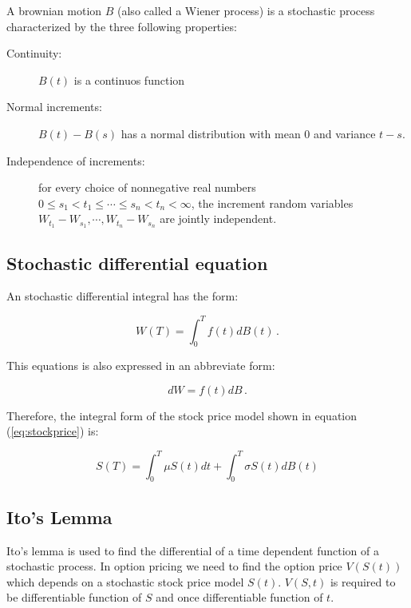 A brownian motion $B$ (also called a Wiener process) is a stochastic process characterized by the three following properties:

\begin{description}
\item[Continuity:] $B(t)$ is a continuos function
\item[Normal increments:]  $B(t)-B(s)$ has a normal distribution with mean $0$ and variance $t-s$.
\item[Independence of increments:] for every choice of nonnegative real numbers $0 \leq s_1 <  t_1 \leq \cdots \leq s_n < t_n < \infty$, the increment random variables $W_{t_1} - W_{s_1}, \cdots, W_{t_n} - W_{s_n}$ are jointly independent.
\end{description}

\subsection{Stochastic differential equation}

An stochastic differential integral has the form:


\begin{equation}
W(T)=\int_0^T f(t)dB(t) \, .
\end{equation}

\noindent This equations is also expressed in an abbreviate form:

\begin{equation}
dW = f(t) dB \, .
\end{equation}

\noindent Therefore, the integral form of the stock price model shown in equation (\ref{eq:stockprice}) is:

\begin{equation}
S(T)=\int_0^T \mu S(t) dt + \int_0^T \sigma S(t) dB(t)
\end{equation}

\subsection{Ito's Lemma}

Ito's lemma is used to find the differential of a time dependent function of a stochastic process. In option pricing we need to find the option price $V(S(t))$ which depends on a stochastic stock price model $S(t)$. 
$V(S,t)$ is required to be  differentiable function of $S$ and once differentiable function of $t$.





